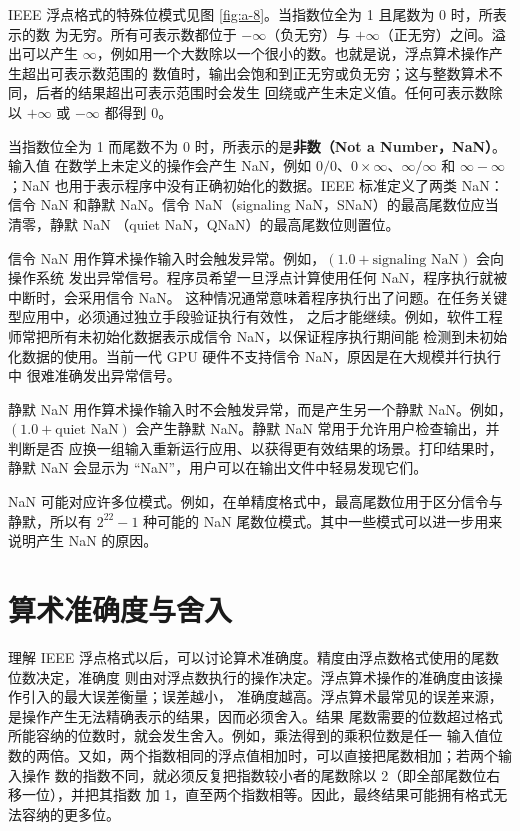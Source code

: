 IEEE 浮点格式的特殊位模式见图 \ref{fig:a-8}。当指数位全为 1 且尾数为 0 时，所表示的数
为无穷。所有可表示数都位于 $-\infty$（负无穷）与 $+\infty$（正无穷）之间。溢出可以产生
$\infty$，例如用一个大数除以一个很小的数。也就是说，浮点算术操作产生超出可表示数范围的
数值时，输出会饱和到正无穷或负无穷；这与整数算术不同，后者的结果超出可表示范围时会发生
回绕或产生未定义值。任何可表示数除以 $+\infty$ 或 $-\infty$ 都得到 0。

当指数位全为 1 而尾数不为 0 时，所表示的是\textbf{非数（Not a Number，NaN）}。输入值
在数学上未定义的操作会产生 NaN，例如 $0/0$、$0\times\infty$、$\infty/\infty$ 和
$\infty-\infty$；NaN 也用于表示程序中没有正确初始化的数据。IEEE 标准定义了两类 NaN：
信令 NaN 和静默 NaN。信令 NaN（signaling NaN，SNaN）的最高尾数位应当清零，静默 NaN
（quiet NaN，QNaN）的最高尾数位则置位。

信令 NaN 用作算术操作输入时会触发异常。例如，$(1.0+\text{signaling NaN})$ 会向操作系统
发出异常信号。程序员希望一旦浮点计算使用任何 NaN，程序执行就被中断时，会采用信令 NaN。
这种情况通常意味着程序执行出了问题。在任务关键型应用中，必须通过独立手段验证执行有效性，
之后才能继续。例如，软件工程师常把所有未初始化数据表示成信令 NaN，以保证程序执行期间能
检测到未初始化数据的使用。当前一代 GPU 硬件不支持信令 NaN，原因是在大规模并行执行中
很难准确发出异常信号。

静默 NaN 用作算术操作输入时不会触发异常，而是产生另一个静默 NaN。例如，
$(1.0+\text{quiet NaN})$ 会产生静默 NaN。静默 NaN 常用于允许用户检查输出，并判断是否
应换一组输入重新运行应用、以获得更有效结果的场景。打印结果时，静默 NaN 会显示为
``NaN''，用户可以在输出文件中轻易发现它们。

NaN 可能对应许多位模式。例如，在单精度格式中，最高尾数位用于区分信令与静默，所以有
$2^{22}-1$ 种可能的 NaN 尾数位模式。其中一些模式可以进一步用来说明产生 NaN 的原因。

\section{算术准确度与舍入}
\label{sec:appa-accuracy-rounding}

理解 IEEE 浮点格式以后，可以讨论算术准确度。精度由浮点数格式使用的尾数位数决定，准确度
则由对浮点数执行的操作决定。浮点算术操作的准确度由该操作引入的最大误差衡量；误差越小，
准确度越高。浮点算术最常见的误差来源，是操作产生无法精确表示的结果，因而必须舍入。结果
尾数需要的位数超过格式所能容纳的位数时，就会发生舍入。例如，乘法得到的乘积位数是任一
输入值位数的两倍。又如，两个指数相同的浮点值相加时，可以直接把尾数相加；若两个输入操作
数的指数不同，就必须反复把指数较小者的尾数除以 2（即全部尾数位右移一位），并把其指数
加 1，直至两个指数相等。因此，最终结果可能拥有格式无法容纳的更多位。

